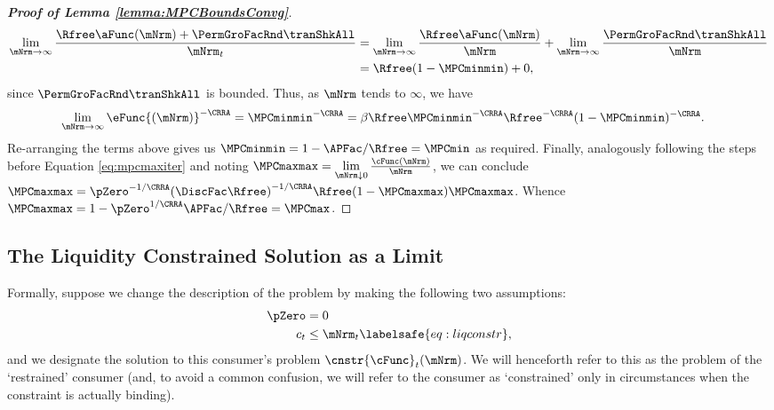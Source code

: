 \documentclass[\econtexRoot/BufferStockTheory]{subfiles}
\begin{document}
\begin{proof}[\textbf{Proof of Lemma \ref{lemma:MPCBoundsConvg}}]
\begin{equation}\begin{gathered}\begin{aligned}
\lim_{\mNrm\rightarrow \infty}\frac{\Rfree \aFunc(\mNrm)+{\PermGroFacRnd}{\tranShkAll}}{\mNrm_{t}} &  = \lim_{\mNrm \rightarrow \infty}\frac{\Rfree \aFunc(\mNrm)}{\mNrm} + \lim_{\mNrm\rightarrow \infty}\frac{{\PermGroFacRnd}{\tranShkAll}}{\mNrm} \\
			& = \Rfree (1- \MPCminmin) + 0, 
\end{aligned}\end{gathered}\end{equation}
since ${\PermGroFacRnd}{\tranShkAll}$ is bounded.
Thus, as $\mNrm$ tends to $\infty$, we have
%
\begin{equation}\begin{gathered}\begin{aligned} 
 \lim\limits_{\mNrm\rightarrow \infty}\eFunc{(\mNrm)}^{-\CRRA}  & =  \MPCminmin^{-\CRRA} = \beta\Rfree\MPCminmin^{-\CRRA}\Rfree^{-\CRRA} (1- \MPCminmin) ^{-\CRRA}. 
\end{aligned}\end{gathered}\end{equation}
%
Re-arranging the terms above gives us $\MPCminmin =1-  \APFac/\Rfree =  \MPCmin$ as required.
Finally, analogously following the steps before Equation \eqref{eq:mpcmaxiter} and noting $\MPCmaxmax = \lim\limits_{\mNrm\downarrow 0}\frac{\cFunc(\mNrm)}{\mNrm}$, we can conclude $\MPCmaxmax  = \pZero^{-1/\CRRA} {(\DiscFac
\Rfree)}^{-1/\CRRA}\Rfree(1-\MPCmaxmax)\MPCmaxmax$.
Whence $\MPCmaxmax = 1- \pZero^{1/\CRRA}\APFac/\Rfree = \MPCmax$.




%
\end{proof}

\subsection{The Liquidity Constrained Solution as a Limit}\label{sec:LiqConstrAsLimit}

Formally, suppose we change the description of the problem by making
the following two assumptions:
\begin{eqnarray*}
  \pZero   & = 0
  \\  c_{t} & \leq  \mNrm_{t} \labelsafe{eq:liqconstr},
\end{eqnarray*}
and we designate the solution to this consumer's problem $\cnstr{\cFunc}_{t}(\mNrm)$.
We will henceforth refer to this as the problem of the `restrained' consumer (and, to avoid a common confusion, we will refer to the consumer as `constrained' only in circumstances when the constraint is actually binding).
\end{document}
